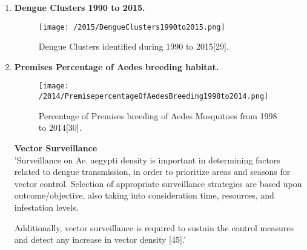 \documentclass[11pt]{exam}
\begin{document}
\begin{questions}
\begin{enumerate}
\item \textbf{Dengue Clusters 1990 to 2015.}
\begin{figure}[H]
  \centering
   \texttt{[image: /2015/DengueClusters1990to2015.png]} 
  \caption{Dengue Clusters identified during 1990 to 2015[29].}
   \label{Dengue Clusters in Singapore 1990-2015}
\end{figure} 

\newpage
\item \textbf{Premises Percentage of Aedes breeding habitat.}
\begin{figure}[H]
  \centering
   \texttt{[image: /2014/PremisepercentageOfAedesBreeding1998to2014.png]} 
  \caption{Percentage of Premises breeding of Aedes Mosquitoes from 1998 to 2014[30].}
   \label{Aedes Mosquito Breeding}
\end{figure} 

\textbf{Vector Surveillance}\\

'Surveillance on Ae. aegypti density is important in determining factors related to dengue transmission, in order to prioritize areas and seasons for vector control. Selection of appropriate surveillance strategies are based upon outcome/objective, also taking into consideration time, resources, and infestation levels.

Additionally, vector surveillance is required to sustain the control measures and detect any increase in vector density [45].'


\end{enumerate}
\end{questions}
\end{document}
